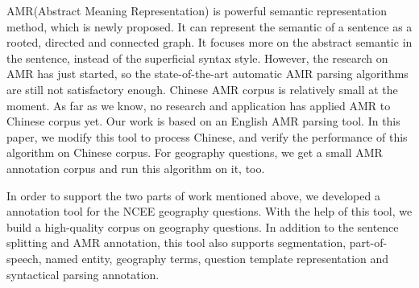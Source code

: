 \documentclass[master, winfont]{njuthesis}
\begin{document}
\begin{englishabstract}
AMR(Abstract Meaning Representation) is powerful semantic representation method, which is newly proposed. It can represent the semantic of a sentence as a rooted, directed and connected graph. It focuses more on the abstract semantic in the sentence, instead of the superficial syntax style. However, the research on AMR has just started, so the state-of-the-art automatic AMR parsing algorithms are still not satisfactory enough. Chinese AMR corpus is relatively small at the moment. As far as we know, no research and application has applied AMR to Chinese corpus yet. Our work is based on an English AMR parsing tool. In this paper, we modify this tool to process Chinese, and verify the performance of this algorithm on Chinese corpus. For geography questions, we get a small AMR annotation corpus and run this algorithm on it, too.

In order to support the two parts of work mentioned above, we developed a annotation tool for the NCEE geography questions. With the help of this tool, we build a high-quality corpus on geography questions. In addition to the sentence splitting and AMR annotation, this tool also supports segmentation, part-of-speech, named entity, geography terms, question template representation and syntactical parsing annotation.

\end{englishabstract}

%
%

\tableofcontents

\listoffigures
\end{document}
